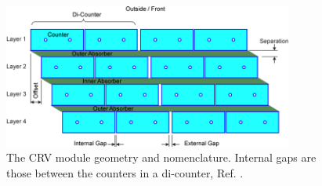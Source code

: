 \begin{figure}[!h]
\centering
\includegraphics[width =0.85\textwidth]{images/chapter2/Crv_module_geometry.png}
\caption{The CRV module geometry and nomenclature. Internal gaps are those between the counters in a di-counter, Ref. \cite{Giovannella_2020}.}
\label{fig:crvmodule}
\end{figure}
